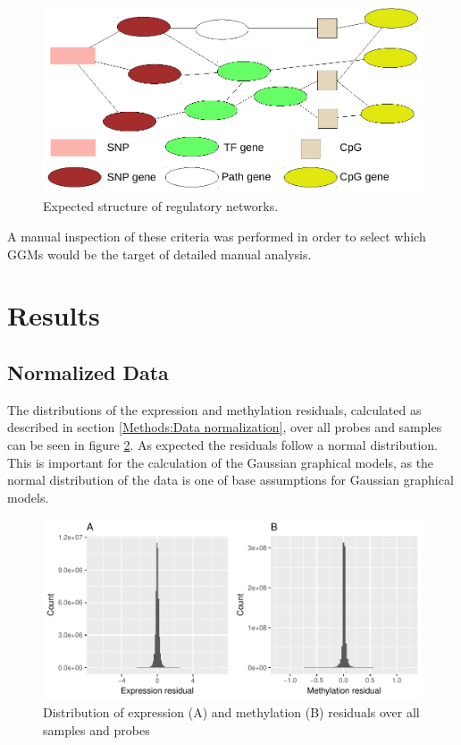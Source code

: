 \documentclass[a4paper,12pt,twoside,openright]{article}
\let\oldsection\section
\def\section{\cleardoublepage\oldsection}
\begin{document}
\begin{figure}[b!]
	\includegraphics[scale=0.92, keepaspectratio = true]{../figures/ggm_expectation_scheme}
	\caption{Expected structure of regulatory networks. }
	\label{fig:ggm.expectation.scheme}
\end{figure}

A manual inspection of these criteria was performed in order to select which GGMs would be the target of detailed manual analysis. 

\newpage
\section{Results}
\label{Results}
\subsection{Normalized Data}
\label{Results:Normalized Data}
The distributions of the expression and methylation residuals, calculated as described in section \ref{Methods:Data normalization}, over all probes and samples can be seen in figure \ref{fig:expr.meth.res.hist}. As expected the residuals follow a normal distribution. This is important for the calculation of the Gaussian graphical models, as the normal distribution of the data is one of base assumptions for Gaussian graphical models\cite{Mohammadi2015}.

\begin{figure}[b!]
	\includegraphics[scale=1, keepaspectratio = true]{../figures/expr_meth_res_hist}
	\caption{Distribution of expression (A) and methylation (B) residuals over all samples and probes}
	\label{fig:expr.meth.res.hist}
\end{figure}
\end{document}
